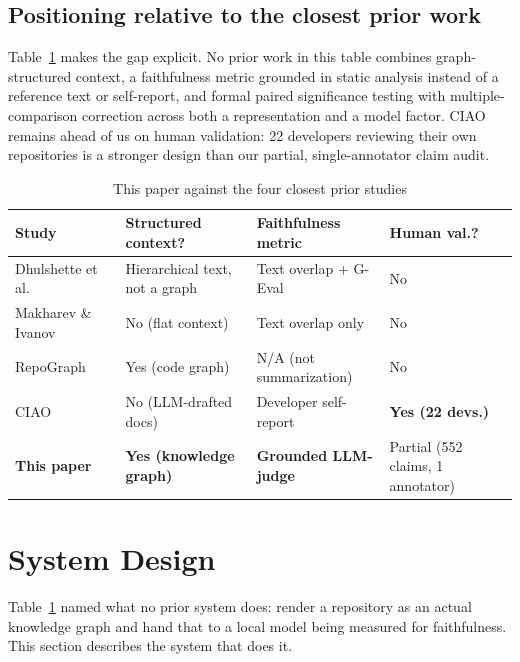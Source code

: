 \documentclass[conference]{IEEEtran}
\begin{document}
\subsection{Positioning relative to the closest prior work}
Table~\ref{tab:related} makes the gap explicit. No prior work in this table combines
graph-structured context, a faithfulness metric grounded in static analysis instead of a
reference text or self-report, and formal paired significance testing with
multiple-comparison correction across both a representation and a model factor. CIAO remains
ahead of us on human validation: 22 developers reviewing their own repositories is a stronger
design than our partial, single-annotator claim audit.

\begin{table}[htbp]
\caption{This paper against the four closest prior studies}
\label{tab:related}
\centering
\footnotesize
\begin{tabular}{@{}p{1.5cm}p{1.4cm}p{1.5cm}p{1.5cm}@{}}
\toprule
Study & Structured context? & Faithfulness metric & Human val.? \\
\midrule
Dhulshette et al.~\cite{dhulshette2025hierarchical} & Hierarchical text, not a graph & Text overlap + G-Eval & No \\
Makharev \& Ivanov~\cite{makharev2025beyond} & No (flat context) & Text overlap only & No \\
RepoGraph~\cite{ouyang2024repograph} & Yes (code graph) & N/A (not summarization) & No \\
CIAO~\cite{deluca2026ciao} & No (LLM-drafted docs) & Developer self-report & \textbf{Yes (22 devs.)} \\
\textbf{This paper} & \textbf{Yes (knowledge graph)} & \textbf{Grounded LLM-judge} & Partial (552 claims, 1 annotator) \\
\bottomrule
\end{tabular}
\end{table}

\section{System Design}
\label{sec:system}

Table~\ref{tab:related} named what no prior system does: render a repository as an actual
knowledge graph and hand that to a local model being measured for faithfulness. This section
describes the system that does it.
\end{document}
